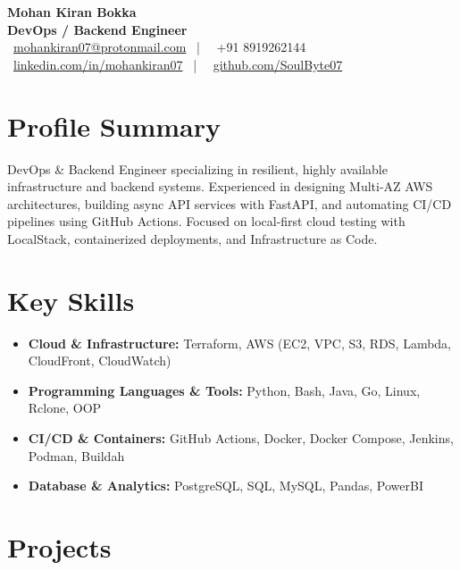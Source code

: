 \documentclass[10pt, letterpaper]{article}
\begin{document}
\pagestyle{empty}

\begin{center}
    {\LARGE \textbf{Mohan Kiran Bokka}} \\
    \vspace{2pt}
    {\large \textbf{DevOps / Backend Engineer}} \\
    \faEnvelope\ \href{mailto:mohankiran07@protonmail.com}{mohankiran07@protonmail.com} \ | \ \faPhone\ +91 8919262144 \\
    \faLinkedin\ \href{https://linkedin.com/in/mohankiran07}{linkedin.com/in/mohankiran07} \ | \ \faGithub\ \href{https://github.com/SoulByte07}{github.com/SoulByte07}
\end{center}

\section{Profile Summary}
DevOps \& Backend Engineer specializing in resilient, highly available infrastructure and backend systems. Experienced in designing Multi-AZ AWS architectures, building async API services with FastAPI, and automating CI/CD pipelines using GitHub Actions. Focused on local-first cloud testing with LocalStack, containerized deployments, and Infrastructure as Code.

\section{Key Skills}
\begin{itemize}
    \item \textbf{Cloud \& Infrastructure:} Terraform, AWS (EC2, VPC, S3, RDS, Lambda, CloudFront, CloudWatch)
    \item \textbf{Programming Languages \& Tools:} Python, Bash, Java, Go, Linux, Rclone, OOP
    \item \textbf{CI/CD \& Containers:} GitHub Actions, Docker, Docker Compose, Jenkins, Podman, Buildah
    \item \textbf{Database \& Analytics:} PostgreSQL, SQL, MySQL, Pandas, PowerBI
\end{itemize}

\section{Projects}
\end{document}
